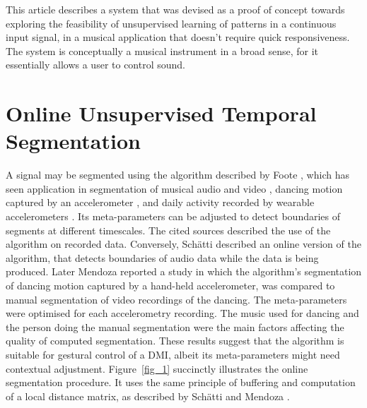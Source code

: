 \documentclass{nime-alternate_ADJ} %
\begin{document}
This article describes a system that was devised as a proof of concept towards exploring the feasibility of unsupervised learning of patterns in a continuous input signal, in a musical application that doesn't require quick responsiveness. The system is conceptually a musical instrument in a broad sense, for it essentially allows a user to control sound.

\section{Online Unsupervised Temporal Segmentation}\label{OUTS}

A signal may be segmented using the algorithm described by Foote \cite{Foote_2000}, which has seen application in segmentation of musical audio and video \cite{Foote_Cooper_2003, Tardieu_etal_2009}, dancing motion captured by an accelerometer \cite{Mendoza_Thompson_2017}, and daily activity recorded by wearable accelerometers \cite{Mendoza_etal_2022, Rodrigues_Probst_Gamboa_2021}. Its meta-parameters can be adjusted to detect boundaries of segments at different timescales. The cited sources described the use of the algorithm on recorded data. Conversely, Schätti \cite{Schatti_2007} described an online version of the algorithm, that detects boundaries of audio data while the data is being produced. Later  
Mendoza \cite{Mendoza_2022} 
reported a study in which the algorithm's segmentation of dancing motion captured by a hand-held accelerometer, was compared to manual segmentation of video recordings of the dancing. The meta-parameters were optimised for each accelerometry recording. The music used for  dancing and the person doing the manual segmentation were the main factors affecting the quality of computed segmentation. These results suggest that the algorithm is suitable for gestural control of a DMI, albeit its meta-parameters might need contextual adjustment. Figure~\ref{fig_1} succinctly illustrates the online segmentation procedure. It uses the same principle of buffering and computation of a local distance matrix, as described by Schätti \cite{Schatti_2007} and 
Mendoza \cite{Mendoza_2022}.
\end{document}
